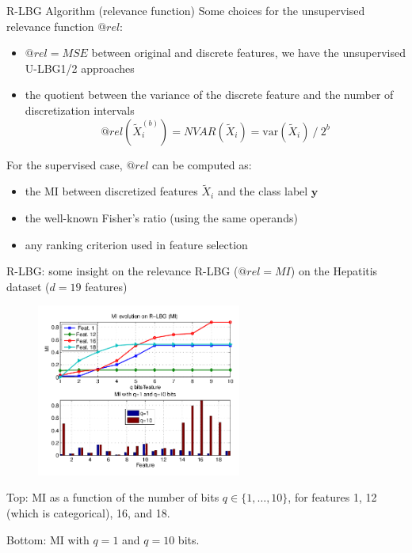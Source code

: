 \documentclass{beamer}
\begin{document}
\begin{frame}{R-LBG Algorithm (relevance function)}
Some choices for the unsupervised relevance function $@rel$:
\begin{itemize}
	\item $@rel=MSE$ between original and discrete features,
	we have the unsupervised U-LBG1/2 approaches
	
	\item the quotient between the variance of the discrete feature and
	the number of discretization intervals
	\begin{equation} \nonumber
	@rel(\widetilde{X}_i^{(b)}) = NVAR(\widetilde{X}_i) = \mbox{var}(\widetilde{X}_i)\  / \ 2^{b}
	\end{equation}
\end{itemize}

\vfill
For the supervised case, $@rel$ can be computed as:
\begin{itemize}
	\item the MI between discretized
features $\widetilde{X}_i$ and the class label $\mathbf{y}$

	\item the well-known Fisher's ratio (using the same operands)
	
	\item any ranking criterion used in feature selection
\end{itemize}
\end{frame}


\begin{frame}{R-LBG: some insight on the relevance}
R-LBG ($@rel=MI$) on the Hepatitis dataset ($d=19$ features)
\begin{figure}
	\centering
	\includegraphics[width=0.6\textwidth]{fig1.png}
\end{figure}
\vspace{-2mm}
{\small Top: MI as
  a function of the number of bits $q \in  \{1,\ldots,10\}$, for features 1,
  12 (which is categorical), 16, and 18.

  Bottom: MI with $q=1$ and $q=10$ bits.}
\end{frame}
\end{document}
